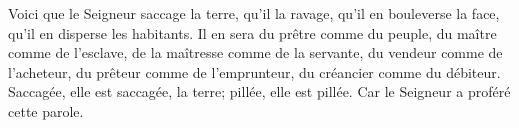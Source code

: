 Voici que le Seigneur saccage la terre, qu’il la ravage,
	qu’il en bouleverse la face, qu’il en disperse les habitants.
Il en sera du prêtre comme du peuple, du maître comme de l’esclave,
	de la maîtresse comme de la servante, du vendeur comme de l’acheteur,
	du prêteur comme de l’emprunteur, du créancier comme du débiteur.
Saccagée, elle est saccagée, la terre;
	pillée, elle est pillée.
Car le Seigneur a proféré cette parole.
